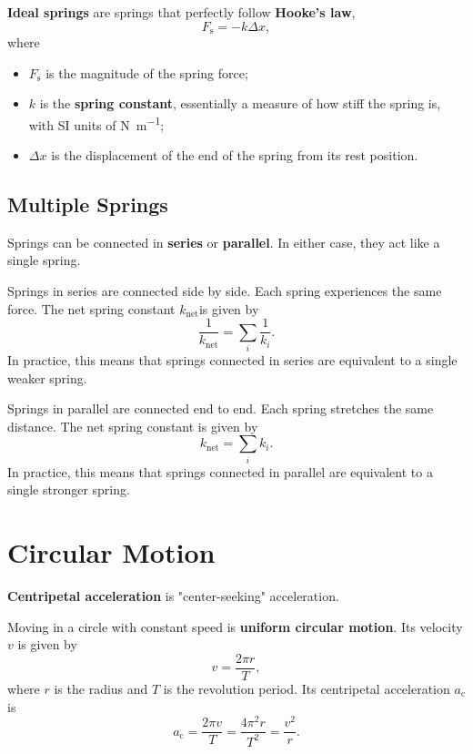 \textbf{Ideal springs} are springs that perfectly follow \textbf{Hooke's law},
\begin{equation} \label{eq:hookes-law}
    F_\mathrm{s} = - k \Delta{x},
\end{equation}
where
\begin{itemize}
    \item \(F_\mathrm{s}\) is the magnitude of the spring force;
    \item \(k\) is the \textbf{spring constant},
        essentially a measure of how stiff the spring is,
        with SI units of \unit{\newton \per \metre};
    \item \(\Delta{x}\) is the displacement of the end of the spring
        from its rest position.
\end{itemize}

\subsection{Multiple Springs}

Springs can be connected in \textbf{series} or \textbf{parallel}.
In either case, they act like a single spring.

Springs in series are connected side by side.
Each spring experiences the same force.
The net spring constant \(k_\mathrm{net}\)is given by
\begin{equation}
    \frac{1}{k_\mathrm{net}} = \sum_i \frac{1}{k_i}.
\end{equation}
In practice,
this means that springs connected in series are equivalent to a
single weaker spring.

Springs in parallel are connected end to end.
Each spring stretches the same distance.
The net spring constant is given by
\begin{equation}
    k_\mathrm{net} = \sum_i k_i.
\end{equation}
In practice,
this means that springs connected in parallel are equivalent to a
single stronger spring.

\section{Circular Motion}

\textbf{Centripetal acceleration} is "center-seeking" acceleration.

Moving in a circle with constant speed is \textbf{uniform circular motion}.
Its velocity \(v\) is given by
\begin{equation}
    v = \frac{2 \pi r}{T},
\end{equation}
where \(r\) is the radius and \(T\) is the revolution period.
Its centripetal acceleration \(a_\mathrm{c}\) is
\begin{equation} \label{eq:centripetal-acceleration}
    a_\mathrm{c} = \frac{2 \pi v}{T} = \frac{4 \pi ^2 r}{T^2} = \frac{v^2}{r}.
\end{equation}

